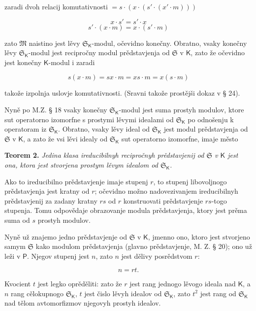 \documentclass[11pt]{article}
\begin{document}
zaradi dvoh relacij komutativnosti \(=s\cdot(x\cdot(s'\cdot(x'\cdot m)))\)

\[
x\cdot s'=s'\cdot x
\]
\[
s'\cdot(x\cdot m)=x\cdot(s'\cdot m)
\]

zato \(\mathfrak M\) naistino jest lěvy \(\mathfrak S_{\mathsf K}\)-modul, očevidno konečny. Obratno, vsaky konečny lěvy \(\mathfrak S_{\mathsf K}\)-modul jest recipročny modul prědstavjenja od \(\mathfrak S\) v \(\mathsf K\), zato že očevidno jest konečny \(\mathsf K\)-modul i zaradi

\[
s(x\cdot m)=sx\cdot m=xs\cdot m=x(s\cdot m)
\]

takože izpolnja uslovje komutativnosti. (Sravni takože prostějši dokaz v § 24).

Nyně po M.Z. § 18 vsaky konečny \(\mathfrak S_{\mathsf K}\)-modul jest suma prostyh modulov, ktore sut operatorno izomorfne s prostymi lěvymi idealami od \(\mathfrak S_{\mathsf K}\) po odnošenju k operatoram iz \(\mathfrak S_{\mathsf K}\). Obratno, vsaky lěvy ideal od \(\mathfrak S_{\mathsf K}\) jest modul prědstavjenja od \(\mathfrak S\) v \(\mathsf K\), a zato že vsi lěvi idealy od \(\mathfrak S_{\mathsf K}\) sut operatorno izomorfne, imaje město

\textbf{Teorem 2.} \emph{Jedina klasa ireducibilnyh recipročnyh prědstavjenij od \(\mathfrak S\) v \(\mathsf K\) jest ona, ktora jest stvorjena prostym lěvym idealom od \(\mathfrak S_{\mathsf K}\).}

Ako to ireducibilno prědstavjenje imaje stupenj \(r\), to stupenj libovoljnogo prědstavjenja jest kratny od \(r\); očevidno možno nadovezivanjem ireducibilnyh prědstavjenij za zadany kratny \(rs\) od \(r\) konstruovati prědstavjenje \(rs\)-togo stupenja. Tomu odpovědaje obrazovanje modula prědstavjenja, ktory jest prěma suma od \(s\) prostyh modulov.

Nyně už znajemo jedno prědstavjenje od \(\mathfrak S\) v \(\mathsf K\), jmenno ono, ktoro jest stvorjeno samym \(\mathfrak S\) kako modulom prědstavjenja (glavno prědstavjenje, M. Z. § 20); ono už leži v \(\mathsf P\). Njegov stupenj jest \(n\), zato \(n\) jest dělivy posrědstvom \(r\):

\[
n=rt.
\]

Kvocient \(t\) jest legko oprěděliti: zato že \(r\) jest rang jednogo lěvogo ideala nad \(\mathsf K\), a \(n\) rang cělokupnogo \(\mathfrak S_{\mathsf K}\), \(t\) jest čislo lěvyh idealov od \(\mathfrak S_{\mathsf K}\), zato \(t^2\) jest rang od \(\mathfrak S_{\mathsf K}\) nad tělom avtomorfizmov njegovyh prostyh idealov.
\end{document}
